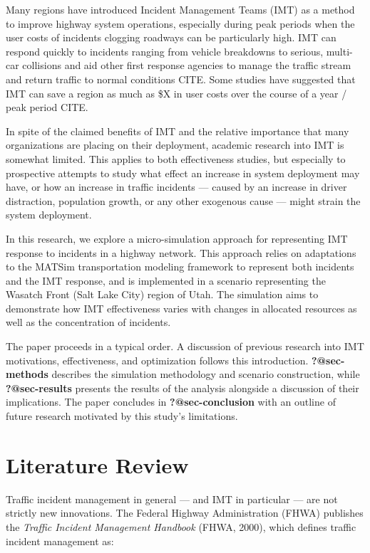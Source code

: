 \documentclass[
  letterpaper,
  authoryear]{elsarticle}
\begin{document}
Many regions have introduced Incident Management Teams (IMT) as a method
to improve highway system operations, especially during peak periods
when the user costs of incidents clogging roadways can be particularly
high. IMT can respond quickly to incidents ranging from vehicle
breakdowns to serious, multi-car collisions and aid other first response
agencies to manage the traffic stream and return traffic to normal
conditions CITE. Some studies have suggested that IMT can save a region
as much as \$X in user costs over the course of a year / peak period
CITE.

In spite of the claimed benefits of IMT and the relative importance that
many organizations are placing on their deployment, academic research
into IMT is somewhat limited. This applies to both effectiveness
studies, but especially to prospective attempts to study what effect an
increase in system deployment may have, or how an increase in traffic
incidents --- caused by an increase in driver distraction, population
growth, or any other exogenous cause --- might strain the system
deployment.

In this research, we explore a micro-simulation approach for
representing IMT response to incidents in a highway network. This
approach relies on adaptations to the MATSim transportation modeling
framework to represent both incidents and the IMT response, and is
implemented in a scenario representing the Wasatch Front (Salt Lake
City) region of Utah. The simulation aims to demonstrate how IMT
effectiveness varies with changes in allocated resources as well as the
concentration of incidents.

The paper proceeds in a typical order. A discussion of previous research
into IMT motivations, effectiveness, and optimization follows this
introduction. \textbf{?@sec-methods} describes the simulation
methodology and scenario construction, while \textbf{?@sec-results}
presents the results of the analysis alongside a discussion of their
implications. The paper concludes in \textbf{?@sec-conclusion} with an
outline of future research motivated by this study's limitations.


\hypertarget{sec-literature}{%
\section{Literature Review}\label{sec-literature}}

Traffic incident management in general --- and IMT in particular --- are
not strictly new innovations. The Federal Highway Administration (FHWA)
publishes the \emph{Traffic Incident Management Handbook} (FHWA, 2000),
which defines traffic incident management as:
\end{document}
